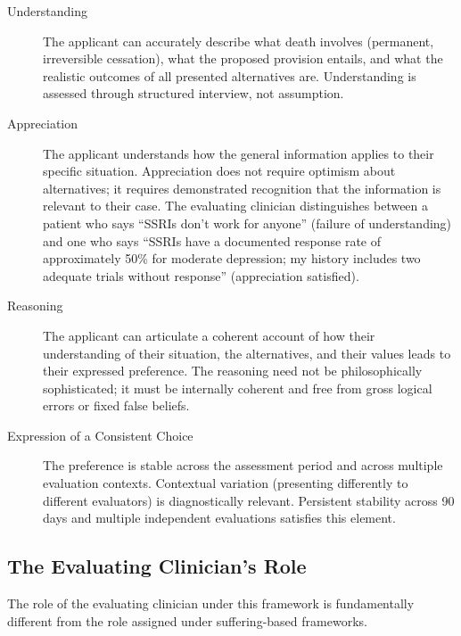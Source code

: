 \documentclass[11pt, letterpaper]{article}
\begin{document}
\begin{description}
  \item[Understanding] The applicant can accurately describe what death involves
    (permanent, irreversible cessation), what the proposed provision entails, and what
    the realistic outcomes of all presented alternatives are. Understanding is assessed
    through structured interview, not assumption.

  \item[Appreciation] The applicant understands how the general information applies to
    their specific situation. Appreciation does not require optimism about alternatives;
    it requires demonstrated recognition that the information is relevant to their case.
    The evaluating clinician distinguishes between a patient who says ``SSRIs don't work
    for anyone'' (failure of understanding) and one who says ``SSRIs have a documented
    response rate of approximately 50\% for moderate depression; my history includes two
    adequate trials without response'' (appreciation satisfied).

  \item[Reasoning] The applicant can articulate a coherent account of how their
    understanding of their situation, the alternatives, and their values leads to their
    expressed preference. The reasoning need not be philosophically sophisticated; it
    must be internally coherent and free from gross logical errors or fixed false beliefs.

  \item[Expression of a Consistent Choice] The preference is stable across the
    assessment period and across multiple evaluation contexts. Contextual variation
    (presenting differently to different evaluators) is diagnostically relevant.
    Persistent stability across 90 days and multiple independent evaluations satisfies
    this element.
\end{description}

\subsection{The Evaluating Clinician's Role}

The role of the evaluating clinician under this framework is fundamentally different
from the role assigned under suffering-based frameworks.
\end{document}
